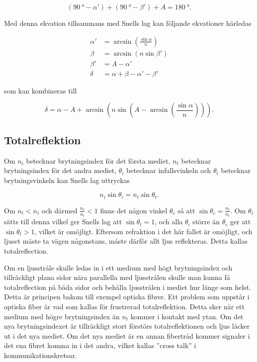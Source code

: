 \documentclass[a4paper]{article}
\begin{document}
  \begin{equation} \label{eq:triSum}
  	(\SI{90}{\degree} - \alpha') + (\SI{90}{\degree} - \beta') + A = \SI{180}{\degree}\text{.}
  \end{equation}
  
  Med denna ekvation tillsammans med Snells lag kan följande ekvationer härledas

  \begin{align} 
  \label{eq:alphaPrim}
  \alpha' &= \arcsin\left(\frac{\sin\alpha}{n}\right)\\
  \label{eq:beta}
  \beta &= \arcsin\left(n \sin\beta'\right)\\
  \label{eq:betaPrim}
  \beta' &= A-\alpha'\\
  \label{eq:delta}
  \delta &= \alpha+\beta-\alpha'-\beta'
  \end{align}
  
  som kan kombineras till

  \begin{equation} \label{eq:avlänkning}
  	\delta = \alpha-A+\arcsin\left(n \sin\left(A-\arcsin\left(\frac{\sin\alpha}{n}\right)\right)\right)\text{.}
  \end{equation}

\subsection{Totalreflektion}

	Om $n_i$ betecknar brytningsindex för det första mediet, $n_t$ betecknar brytningsindex för det andra mediet, $\theta_i$ betecknar infallsvinkeln och $\theta_t$ betecknar brytningsvinkeln kan Snells lag uttryckas \cite[pp.~21--22]{pearsonIntroOpt}
	
	\begin{equation} \label{eq:snell}
		n_i\sin\theta_i = n_t\sin\theta_t\text{.}
	\end{equation}
	
	Om $n_t < n_i$ och därmed $\frac{n_t}{n_i} < 1$ finns det någon vinkel $\theta_c$ så att $\sin\theta_c = \frac{n_t}{n_i}$. Om $\theta_i$ sätts till denna vilkel ger Snells lag att $\sin\theta_t = 1$, och alla $\theta_i$ större än $\theta_c$ ger att $\sin\theta_t > 1$, vilket är omöjligt. Eftersom refraktion i det här fallet är omöjligt, och ljuset måste ta vägen någonstans, måste därför allt ljus reflekteras. Detta kallas totalreflection.
	
	Om en ljusstråle skulle ledas in i ett medium med högt brytningsindex och tillräckligt plana sidor nära parallella med ljusstrålen skulle man kunna få totalreflection på båda sidor och behålla ljusstrålen i mediet hur länge som helst. Detta är principen bakom till exempel optiska fibrer. Ett problem som uppstår i optiska fiber är vad som kallas för frustrerad totalreflektion. Detta sker när ett medium med högre brytningsindex än $n_t$ kommer i kontakt med ytan. Om det nya brytningsindexet är tillräckligt stort förstörs totalreflektionen och ljus läcker ut i det nya mediet. Om det nya mediet är en annan fibertråd kommer signaler i det ena fibret komma in i det andra, vilket kallas ”cross talk” i kommunikationskretsar.
	\cite[pp.~261--263]{pearsonIntroOpt}
\end{document}
